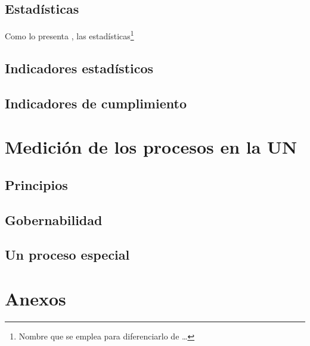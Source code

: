 \documentclass[
]{book}
\begin{document}
\hypertarget{estaduxedsticas}{%
\section{Estadísticas}\label{estaduxedsticas}}

Como lo presenta \citet{Alberto2019}, las estadísticas\footnote{Nombre que se emplea para diferenciarlo de \ldots{}}

\hypertarget{indicadores-estaduxedsticos}{%
\section{Indicadores estadísticos}\label{indicadores-estaduxedsticos}}

\hypertarget{indicadores-de-cumplimiento}{%
\section{Indicadores de cumplimiento}\label{indicadores-de-cumplimiento}}

\hypertarget{indicadoresUN}{%
\chapter{Medición de los procesos en la UN}\label{indicadoresUN}}

\hypertarget{principios}{%
\section{Principios}\label{principios}}

\hypertarget{gobernabilidad}{%
\section{Gobernabilidad}\label{gobernabilidad}}

\hypertarget{un-proceso-especial}{%
\section{Un proceso especial}\label{un-proceso-especial}}

\hypertarget{anexos}{%
\chapter*{Anexos}\label{anexos}}

  
\end{document}
